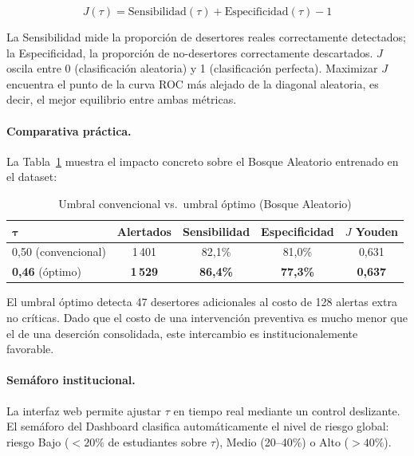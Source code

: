 \documentclass[12pt]{article}
\begin{document}
{\begin{equation}

    J(\tau) = \text{Sensibilidad}(\tau) + \text{Especificidad}(\tau) - 1
    \label{eq:youden}
\end{equation}

La Sensibilidad mide la proporción de desertores reales correctamente detectados;
la Especificidad, la proporción de no-desertores correctamente descartados. $J$
oscila entre 0 (clasificación aleatoria) y 1 (clasificación perfecta). Maximizar $J$
encuentra el punto de la curva ROC más alejado de la diagonal aleatoria, es decir,
el mejor equilibrio entre ambas métricas.

\paragraph{Comparativa práctica.}
La Tabla~\ref{tab:umbral_comparativa} muestra el impacto concreto sobre el Bosque
Aleatorio entrenado en el dataset:

\begin{table}[H]
\centering
\caption{Umbral convencional vs.\ umbral óptimo (Bosque Aleatorio)}
\label{tab:umbral_comparativa}
\begin{tabular}{lcccc}
\toprule
$\boldsymbol{\tau}$ & \textbf{Alertados} & \textbf{Sensibilidad} & \textbf{Especificidad} & \textbf{$J$ Youden} \\
\midrule
0,50 (convencional) & 1\,401 & 82,1\% & 81,0\% & 0,631 \\
\textbf{0,46} (óptimo) & \textbf{1\,529} & \textbf{86,4\%} & \textbf{77,3\%} & \textbf{0,637} \\
\bottomrule
\end{tabular}
\end{table}

El umbral óptimo detecta 47 desertores adicionales al costo de 128 alertas extra no
críticas. Dado que el costo de una intervención preventiva es mucho menor que el de
una deserción consolidada, este intercambio es institucionalemente favorable.

\paragraph{Semáforo institucional.}
La interfaz web permite ajustar $\tau$ en tiempo real mediante un control deslizante.
El semáforo del Dashboard clasifica automáticamente el nivel de riesgo global:
riesgo Bajo ($< 20\%$ de estudiantes sobre $\tau$), Medio (20--40\%) o Alto ($> 40\%$).

}
\end{document}
